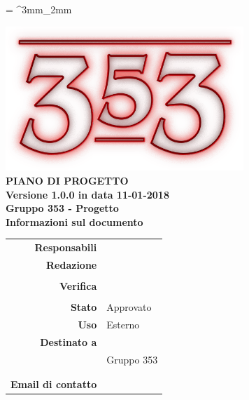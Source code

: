 \documentclass[openany, a4paper, 12pt]{report}
\begin{document}
\tabulinesep = ^3mm_2mm

\begin{titlepage}
	\centering
	\vfill
	{
		\bfseries
		\vskip2cm
		\includegraphics[width=9cm]{../../common/images/logo.png} \\
		\vfill
		\Huge{PIANO DI PROGETTO}\\
		\vfill
		\Large Versione 1.0.0 in data 11-01-2018\\
		\large Gruppo 353 - Progetto \progetto \\
		\vfill
		\normalsize Informazioni sul documento\\
		\begin{table}[htbp]
			\centering
			\renewcommand\arraystretch{1.2}
			\begin{tabular}{r|l}
				\hline
				\textbf{Responsabili}	& \Elena \\
				
				\textbf{Redazione} 		& \Riccardo \\
										& \Valentina \\
										
				\textbf{Verifica} 		& \Parwinder \\
										& \Davide \\	
				
				\textbf{Stato} 			& Approvato\\
				\textbf{Uso}			& Esterno\\
				\textbf{Destinato a}   	& \Proponente\\
										& Gruppo 353\\
										& \Vardanega\\
										& \Cardin\\
				
				\textbf{Email di contatto}	& \mailgroup
			\end{tabular}
		\end{table}
		\vfill
	}    
\end{titlepage}

\tableofcontents
\listoffigures
\listoftables
\newpage
{}






 

\end{document}
